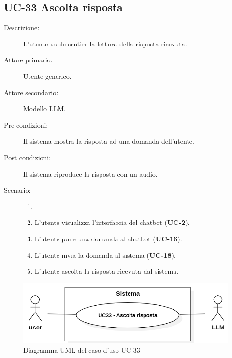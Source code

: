 \subsection{UC-33 Ascolta risposta}
\begin{description}
    \item[Descrizione:] L'utente vuole sentire la lettura della risposta ricevuta.
    \item[Attore primario:] Utente generico.
    \item[Attore secondario:] Modello LLM.
    \item[Pre condizioni:] Il sistema mostra la risposta ad una domanda dell'utente.
    \item[Post condizioni:] Il sistema riproduce la risposta con un audio.
    \item[Scenario:]
    \begin{enumerate}
        \item[] 
        \item L’utente visualizza l'interfaccia del chatbot (\textbf{UC-2}).
        \item L’utente pone una domanda al chatbot (\textbf{UC-16}).
        \item L'utente invia la domanda al sistema (\textbf{UC-18}).
        \item L'utente ascolta la risposta ricevuta dal sistema.
    \end{enumerate}
\end{description}

\begin{figure}[H]
    \centering
    \includegraphics[width=0.9\linewidth]{UC33.PNG}
    \caption{Diagramma UML del caso d'uso UC-33}
    \label{fig:UC33}
\end{figure}
